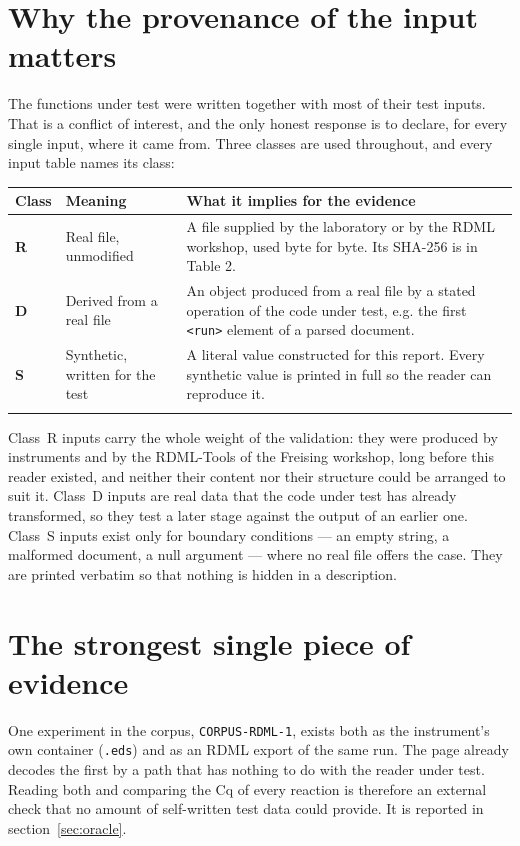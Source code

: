 \documentclass[10pt,a4paper,twoside]{report}
\begin{document}
\section{Why the provenance of the input matters}
The functions under test were written together with most of their test inputs. That is a conflict
of interest, and the only honest response is to declare, for every single input, where it came
from. Three classes are used throughout, and every input table names its class:

\begin{longtable}{@{}p{10mm}p{42mm}p{\dimexpr\linewidth-58mm-16pt\relax}@{}}
\toprule
\textbf{Class} & \textbf{Meaning} & \textbf{What it implies for the evidence} \\
\midrule\endhead

\textbf{R} & Real file, unmodified & A file supplied by the laboratory or by the RDML workshop, used byte for byte. Its SHA-256 is in Table 2. \\
\addlinespace

\textbf{D} & Derived from a real file & An object produced from a real file by a stated operation of the code under test, e.g. the first \texttt{<run>} element of a parsed document. \\
\addlinespace

\textbf{S} & Synthetic, written for the test & A literal value constructed for this report. Every synthetic value is printed in full so the reader can reproduce it. \\
\addlinespace

\bottomrule
\end{longtable}

Class~R inputs carry the whole weight of the validation: they were produced by instruments and by
the RDML-Tools of the Freising workshop, long before this reader existed, and neither their content
nor their structure could be arranged to suit it. Class~D inputs are real data that the code under
test has already transformed, so they test a later stage against the output of an earlier one.
Class~S inputs exist only for boundary conditions --- an empty string, a malformed document, a null
argument --- where no real file offers the case. They are printed verbatim so that nothing is hidden
in a description.

\section{The strongest single piece of evidence}
One experiment in the corpus, \texttt{CORPUS-RDML-1}, exists both as the instrument's own
container (\texttt{.eds}) and as an RDML export of the same run. The page already decodes the first
by a path that has nothing to do with the reader under test. Reading both and comparing the Cq of
every reaction is therefore an external check that no amount of self-written test data could
provide. It is reported in section~\ref{sec:oracle}.
\end{document}
